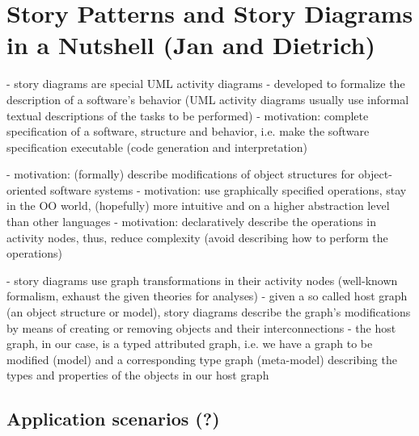 \section{Story Patterns and Story Diagrams in a Nutshell (Jan and Dietrich)} \label{sec:Overview}


- story diagrams are special UML activity diagrams
- developed to formalize the description of a software's behavior (UML activity diagrams usually use informal textual descriptions of the tasks to be performed)
- motivation: complete specification of a software, structure and behavior, i.e. make the software specification executable (code generation and interpretation)

- motivation: (formally) describe modifications of object structures for object-oriented software systems
- motivation: use graphically specified operations, stay in the OO world, (hopefully) more intuitive and on a higher abstraction level than other languages
- motivation: declaratively describe the operations in activity nodes, thus, reduce complexity (avoid describing how to perform the operations)


- story diagrams use graph transformations in their activity nodes (well-known formalism, exhaust the given theories for analyses)
- given a so called host graph (an object structure or model), story diagrams describe the graph's modifications by means of creating or removing objects and their interconnections
- the host graph, in our case, is a typed attributed graph, i.e. we have a graph to be modified (model) and a corresponding type graph (meta-model) describing the types and properties of the objects in our host graph





\subsection{Application scenarios (?)} \label{sec:Applications}
